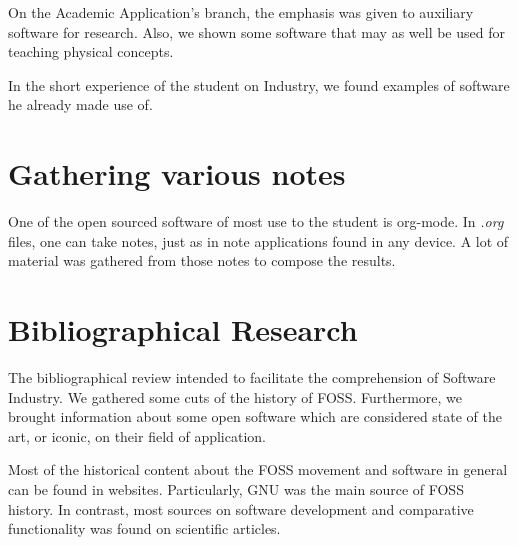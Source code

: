 \documentclass[
12pt,				%
openright,			%
oneside,			%
a4paper,			%
brazil,				%
english,			  %
]{abntex2}
\begin{document}
On the Academic Application's branch, the emphasis was given to
auxiliary software for research. Also, we shown some software that may
as well be used for teaching physical concepts. 

In the short experience of the student on Industry, we found examples
of software he already made use of.

\section{Gathering various notes}

One of the open sourced software of most use to the student is
org-mode. In \textit{.org} files, one can take notes, just as in note
applications found in any device. A lot of material was gathered from
those notes to compose the results.

\section{Bibliographical Research}
The bibliographical review intended to facilitate the comprehension of
Software Industry. We gathered some cuts of the history of
FOSS. Furthermore, we brought information about some open software
which are considered state of the art, or iconic, on their field of application.

Most of the historical content about the FOSS movement and software in
general can be found in websites. Particularly, GNU was the main
source of FOSS history. In contrast, most sources on software
development and comparative functionality was found on scientific articles.
\end{document}

